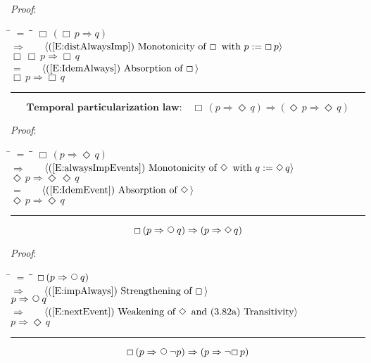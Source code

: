 \documentclass[12pt, fleqn, leqno]{article}
\newcommand{\lgap}{2pt}                             %
\newcommand{\mymathindent}{24pt}                    %
\newcommand{\impl}{\ensuremath{\Rightarrow}}        %
\newcommand{\Next}{\;\,\text{\raisebox{3.5pt}{\circle{6}}}}
\newcommand{\Event}{\Diamond\,}
\newcommand{\Always}{\Box\,}
\newcommand{\myqed}{\rule[-.23ex]{1.2ex}{2.0ex}}
\newcommand{\myqedtab}{\hspace{384pt}}              %
\newcommand{\Gll} {\langle}                         %
\newcommand{\Ggg} {\rangle}                         %
\newcommand{\Hint}[1]     {\ \ \ $\Gll              \mbox{#1} \Ggg$ }   %
\begin{document}
\emph{Proof}:
\begin{tabbing}
\hspace{\mymathindent} \= $= \;$ \= \myqedtab \= \kill
  \> \>   $\Always (\Always p \impl q)$\\[\lgap]
  \> $\impl$  \>  \Hint{(\ref{E:distAlwaysImp}) Monotonicity of $\Always$ with $p:=\Always p$}\\[\lgap]
  \> \>   $\Always \Always p \impl \Always q$\\[\lgap]
  \> $=$  \>  \Hint{(\ref{E:IdemAlways}) Absorption of $\Always$}\\[\lgap]
  \> \>   $\Always p \impl \Always q$ \quad \myqed
\end{tabbing}
\begin{equation}\label{E:tempPartLaw}
\textbf{Temporal particularization law:}\quad \Always ( p \impl \Event q) \impl (\Event p \impl \Event q)
\end{equation}

\emph{Proof}:
\begin{tabbing}
\hspace{\mymathindent} \= $= \;$ \= \myqedtab \= \kill
  \> \>   $\Always (p \impl \Event q)$\\[\lgap]
  \> $\impl$  \>  \Hint{(\ref{E:alwaysImpEvents}) Monotonicity of $\Event$ with $q:=\Event q$}\\[\lgap]
  \> \>   $\Event p \impl \Event \Event q$\\[\lgap]
  \> $=$  \>  \Hint{(\ref{E:IdemEvent}) Absorption of $\Event$}\\[\lgap]
  \> \>   $\Event p \impl \Event q$ \quad \myqed
\end{tabbing}
\begin{equation}\label{E:alwaysPImplNextQ}
\Always (p \impl \Next q) \impl (p \impl \Event q)
\end{equation}

\emph{Proof}:
\begin{tabbing}
\hspace{\mymathindent} \= $= \;$ \= \myqedtab \= \kill
  \> \>   $\Always (p \impl \Next q)$\\[\lgap]
  \> $\impl$  \>  \Hint{(\ref{E:impAlways}) Strengthening of $\Always$}\\[\lgap]
  \> \>   $p \impl \Next q$\\[\lgap]
  \> $\impl$  \>  \Hint{(\ref{E:nextEvent}) Weakening of $\Event$ and (3.82a) Transitivity}\\[\lgap]
  \> \>   $p \impl \Event q$ \quad \myqed
\end{tabbing}
\begin{equation}\label{E:alwaysPImplNextNotP}
\Always (p \impl \Next \neg p) \impl (p \impl \neg\Always p)
\end{equation}
\end{document}
